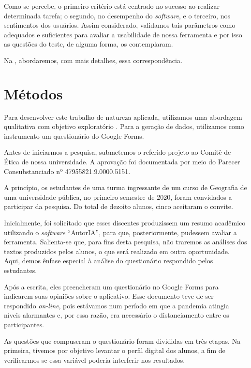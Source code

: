 \documentclass[portuguese]{textolivre}
\begin{document}
Como se percebe, o primeiro critério está centrado no sucesso ao realizar determinada tarefa; o segundo, no desempenho do \textit{software}, e o terceiro, nos sentimentos dos usuários. Assim considerado, validamos tais parâmetros como adequados e suficientes para avaliar a usabilidade de nossa ferramenta e por isso as questões do teste, de alguma forma, os contemplaram.

Na , abordaremos, com mais detalhes, essa correspondência.

\section{Métodos}\label{sec-modelo}
Para desenvolver este trabalho de natureza aplicada, utilizamos uma abordagem qualitativa com objetivo exploratório \cite{paiva2019}. Para a geração de dados, utilizamos como instrumento um questionário do Google Forms.

Antes de iniciarmos a pesquisa, submetemos o referido projeto ao Comitê de Ética de nossa universidade. A aprovação foi documentada por meio do Parecer Consubstanciado nº 47955821.9.0000.5151.

A princípio, os estudantes de uma turma ingressante de um curso de Geografia de uma universidade pública, no primeiro semestre de 2020, foram convidados a participar da pesquisa. Do total de dezoito alunos, cinco aceitaram o convite.

Inicialmente, foi solicitado que esses discentes produzissem um resumo acadêmico utilizando o \textit{software} “AutorIA”, para que, posteriormente, pudessem avaliar a ferramenta. Salienta-se que, para fins desta pesquisa, não traremos as análises dos textos produzidos pelos alunos, o que será realizado em outra oportunidade. Aqui, demos ênfase especial à análise do questionário respondido pelos estudantes.

Após a escrita, eles preencheram um questionário no Google Forms para indicarem suas opiniões sobre o aplicativo. Esse documento teve de ser respondido \textit{on-line}, pois estávamos num período em que a pandemia atingia níveis alarmantes e, por essa razão, era necessário o distanciamento entre os participantes.

As questões que compuseram o questionário foram divididas em três etapas. Na primeira, tivemos por objetivo levantar o perfil digital dos alunos, a fim de verificarmos se essa variável poderia interferir nos resultados.
\end{document}
